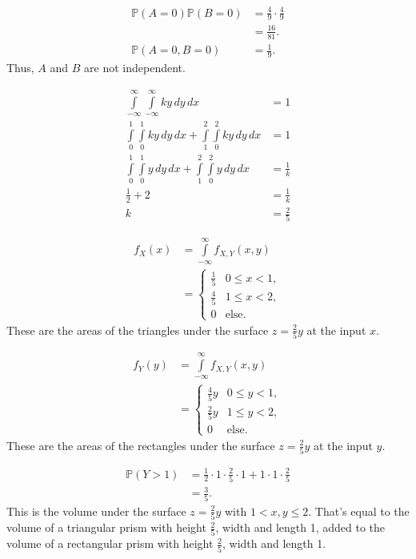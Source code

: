 \documentclass[12pt]{article}
\begin{document}
\medskip
{}
\begin{align*}
    \mathbb P(A = 0) \mathbb P(B = 0) &= \frac49 \cdot \frac49 \\
                                      &= \frac{16}{81}. \\
    \mathbb P(A = 0, B = 0) &= \frac19.
\end{align*} Thus, $A$ and $B$ are not independent.

\newpage
{}

\medskip
{}
\begin{align*}
    \int\limits_{-\infty}^\infty \int\limits_{-\infty}^\infty ky\,dy\,dx &= 1 \\
    \int\limits_0^1\int\limits_0^1ky\,dy\,dx + \int\limits_1^2\int\limits_0^2 ky\,dy\,dx &= 1 \\
    \int\limits_0^1\int\limits_0^1y\,dy\,dx + \int\limits_1^2\int\limits_0^2 y\,dy\,dx &= \frac1k \\
    \frac12 + 2 &= \frac1k \\
    k &= \frac25
\end{align*}

\medskip
{}
\begin{align*}
    f_X(x) &= \int\limits_{-\infty}^\infty f_{X,Y}(x,y) \\
           &= \begin{cases} \frac15 & 0 \leq x < 1, \\
                            \frac45 & 1 \leq x < 2, \\
                            0 & \text{else.} \end{cases}
\end{align*} These are the areas of the triangles under the surface $z=\frac25y$ at the input $x$.

\begin{align*}
    f_Y(y) &= \int\limits_{-\infty}^\infty f_{X,Y}(x,y) \\
           &= \begin{cases} \frac45y & 0 \leq y < 1, \\
                            \frac25y & 1 \leq y < 2, \\
                            0 & \text{else.} \end{cases}
\end{align*} These are the areas of the rectangles under the surface $z=\frac25y$ at the input $y$.

\medskip
{}
\begin{align*}
    \mathbb P(Y > 1) &= \frac12 \cdot 1 \cdot \frac25 \cdot 1 + 1 \cdot 1 \cdot \frac25 \\
                     &= \frac35.
\end{align*} This is the volume under the surface $z=\frac25y$ with $1 < x,y \leq 2$. That's equal to the volume of a triangular prism with height $\frac25$, width and length 1, added to the volume of a rectangular prism with height $\frac25$, width and length 1.
\end{document}

